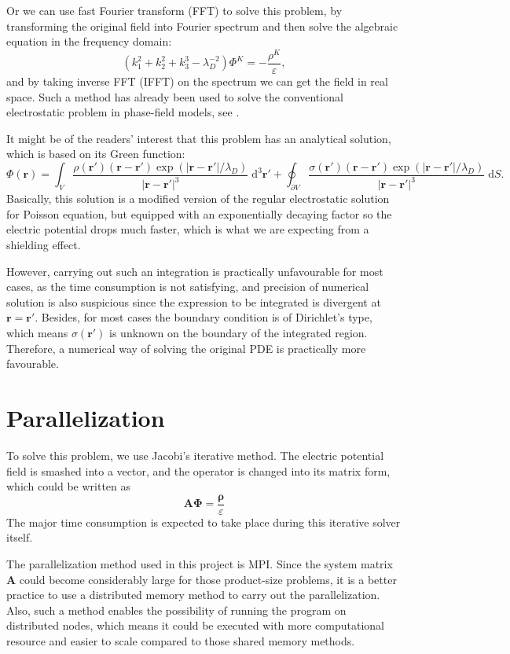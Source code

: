 \documentclass{article}
\begin{document}
\begin{spacing}{1.1}
Or we can use fast Fourier transform (FFT) to solve this problem, by transforming the original field into Fourier spectrum and then solve the algebraic equation in the frequency domain:
\[(k_1^2+k_2^2+k_3^3-\lambda_D^{-2})\Phi^K=-\frac{\rho^K}{\varepsilon},\]
and by taking inverse FFT (IFFT) on the spectrum we can get the field in real space. Such a method has already been used to solve the conventional electrostatic problem in phase-field models, see \citep{li2002}.

It might be of the readers' interest that this problem has an analytical solution, which is based on its Green function:
\[ \Phi(\mathbf{r}) =
\int _V \frac{\rho(\mathbf{r'}) (\mathbf{r} - \mathbf{r'}) \exp(|\mathbf{r} - \mathbf{r'}| / \lambda_D)}{|\mathbf{r} - \mathbf{r'}|^3} \;\mathrm{d}^3 \mathbf{r'} +
\oint _{\partial V} \frac{\sigma(\mathbf{r'}) (\mathbf{r} - \mathbf{r'}) \exp(|\mathbf{r} - \mathbf{r'}| / \lambda_D)}{|\mathbf{r} - \mathbf{r'}|^3} \;\mathrm{d} S.\]
Basically, this solution is a modified version of the regular electrostatic solution for Poisson equation, but equipped with an exponentially decaying factor so the electric potential drops much faster, which is what we are expecting from a shielding effect.

However, carrying out such an integration is practically unfavourable for most cases, as the time consumption is not satisfying, and precision of numerical solution is also suspicious since the expression to be integrated is divergent at $\mathbf{r} = \mathbf{r'}$. Besides, for most cases the boundary condition is of Dirichlet's type, which means $\sigma(\mathbf{r'})$ is unknown on the boundary of the integrated region. Therefore, a numerical way of solving the original PDE is practically more favourable.


\section{Parallelization}

To solve this problem, we use Jacobi's iterative method. The electric potential field is smashed into a vector, and the operator is changed into its matrix form, which could be written as
\[\mathbf{A\Phi}=\frac{\mathbf{\rho}}{\varepsilon}\]
The major time consumption is expected to take place during this iterative solver itself.

The parallelization method used in this project is MPI. Since the system matrix $\mathbf{A}$ could become considerably large for those product-size problems, it is a better practice to use a distributed memory method to carry out the parallelization. Also, such a method enables the possibility of running the program on distributed nodes, which means it could be executed with more computational resource and easier to scale compared to those shared memory methods.


\end{spacing}
\end{document}
